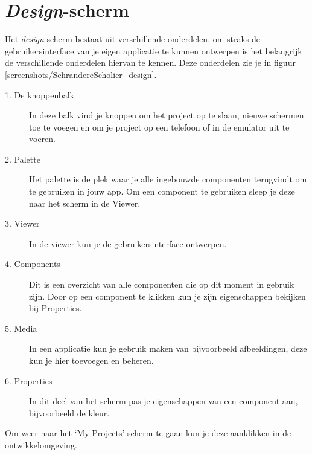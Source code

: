 \section{\emph{Design}-scherm}
\label{sec:design-scherm}
Het  \emph{design}-scherm bestaat uit verschillende onderdelen, om straks de gebruikersinterface van je eigen applicatie te kunnen ontwerpen is het belangrijk de verschillende onderdelen hiervan te kennen. Deze onderdelen zie je in figuur \ref{screenshots/SchrandereScholier_design}.


\begin{description}
  \item[1. De knoppenbalk] In deze balk vind je knoppen om het project op te slaan, nieuwe schermen toe te voegen en om je project op een telefoon of in de emulator uit te voeren.
  \item[2. Palette] Het palette is de plek waar je alle ingebouwde componenten terugvindt om te gebruiken in jouw app. Om een component te gebruiken sleep je deze naar het scherm in de Viewer.
  \item[3. Viewer] In de viewer kun je de gebruikersinterface ontwerpen. 
  \item[4. Components] Dit is een overzicht van alle componenten die op dit moment in gebruik zijn. Door op een component te klikken kun je zijn eigenschappen bekijken bij Properties.
  \item[5. Media] In een applicatie kun je gebruik maken van bijvoorbeeld afbeeldingen, deze kun je hier toevoegen en beheren.
  \item[6. Properties] In dit deel van het scherm pas je eigenschappen van een component aan, bijvoorbeeld de kleur.
\end{description}

Om weer naar het `My Projects' scherm te gaan kun je deze aanklikken in de ontwikkelomgeving.
